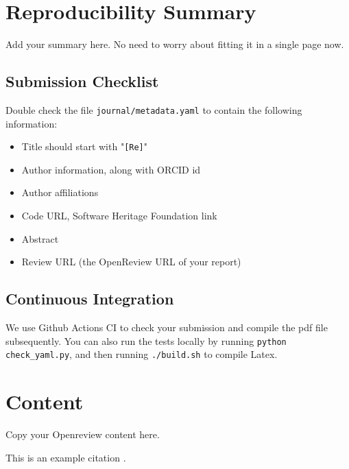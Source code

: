 \section{Reproducibility Summary}

Add your summary here. No need to worry about fitting it in a single page now.

\subsection{Submission Checklist}

Double check the file \texttt{journal/metadata.yaml} to contain the following information:

\begin{itemize}
\item Title should start with "\texttt{[Re]}"
\item Author information, along with ORCID id
\item Author affiliations
\item Code URL, Software Heritage Foundation link
\item Abstract
\item Review URL (the OpenReview URL of your report)
\end{itemize}

\subsection{Continuous Integration}

We use Github Actions CI to check your submission and compile the pdf file subsequently.
You can also run the tests locally by running \texttt{python check\_yaml.py}, and then running \texttt{./build.sh} to compile Latex.

\clearpage

\section{Content}
Copy your Openreview content here.

This is an example citation \cite{Sinha:2021}.

%
%
%
%
%
%
